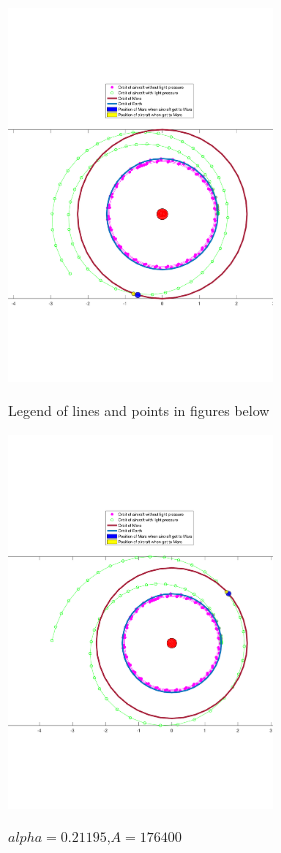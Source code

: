 \documentclass[../Paper.tex]{subfiles}
\begin{document}
\begin{figure}[H]
 \begin{minipage}[t]{0.5\linewidth}
 \centering{}
 \includegraphics[width=7cm]{../Figures/label_of_7_orbits.pdf}
 \label{fig:orbitlegend}
 \caption{Legend of lines and points in figures below}
 \end{minipage}
 \begin{minipage}[t]{0.5\linewidth}
 \centering{}
 \includegraphics[width=7cm]{../Figures/orbit1.pdf}
 \label{fig:orbit1}
\caption{$alpha=0.21195$,$A=176400$}
 \end{minipage}
\end{figure}
\end{document}
